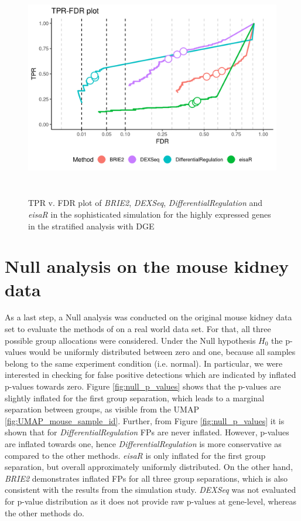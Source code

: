 \begin{figure}[!htb]
\begin{center}
\includegraphics[width=6in,height=3.8in]{../figures/simulation/minnow_simulation_high_DGE_FDR.png}
\end{center}
\caption{TPR v. FDR plot of \emph{BRIE2}, \emph{DEXSeq}, \emph{DifferentialRegulation} and \emph{eisaR} in the sophisticated simulation for the highly expressed genes in the stratified analysis with DGE}
\label{fig:soph_sim_DGE_FDR_high}
\end{figure}
\FloatBarrier

\section{Null analysis on the mouse kidney data}
As a last step, a Null analysis was conducted on the original mouse kidney data set to evaluate the methods of on a real world data set. For that, all three possible group allocations were considered. Under the Null hypothesis $H_0$ the p-values would be uniformly distributed between zero and one, because all samples belong to the same experiment condition (i.e. normal). In particular, we were interested in checking for false positive detections which are indicated by inflated p-values towards zero. Figure \ref{fig:null_p_values} shows that the p-values are slightly inflated for the first group separation, which leads to a marginal separation between groups, as visible from the UMAP \ref{fig:UMAP_mouse_sample_id}. Further, from Figure \ref{fig:null_p_values} it is shown that for \emph{DifferentialRegulation} FPs are never inflated. However, p-values are inflated towards one, hence \emph{DifferentialRegulation} is more conservative as compared to the other methods. \emph{eisaR} is only inflated for the first group separation, but overall approximately uniformly distributed. On the other hand, \emph{BRIE2} demonstrates inflated FPs for all three group separations, which is also consistent with the results from the simulation study. \emph{DEXSeq} was not evaluated for p-value distribution as it does not provide raw p-values at gene-level, whereas the other methods do.

